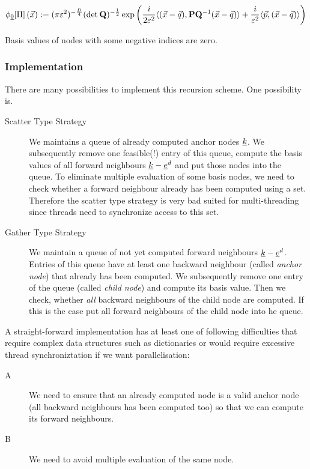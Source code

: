 \documentclass{article}
\begin{document}
\begin{equation}
  \label{eq:phi0_Dd}
  \phi_{\underline{0}}[\Pi]\left(\vec{x}\right)
  :=
  (\pi\varepsilon^2)^{-\frac{D}{4}} (\det\mathbf{Q})^{-\frac{1}{2}}
  \exp \left( \frac{i}{2\varepsilon^2}
    \langle (\vec{x}-\vec{q}) , \mathbf{P}\mathbf{Q}^\mathrm{-1}(\vec{x}-\vec{q}) \rangle
    + \frac{i}{\varepsilon^2} \langle \vec{p} , (\vec{x}-\vec{q}) \rangle
  \right)
\end{equation}

Basis values of nodes with some negative indices are zero.

\subsubsection{Implementation}
There are many possibilities to implement this recursion scheme. One
possibility is.
\begin{description}
\item[Scatter Type Strategy] We maintains a queue of already computed
  anchor nodes $\underline{k}$.  We subsequently remove one feasible(!)
  entry of this queue, compute the basis values of all forward
  neighbours $\underline{k}-\underline{e}^d$ and put those nodes into the
  queue.  To eliminate multiple evaluation of some basis nodes, we
  need to check whether a forward neighbour already has been computed
  using a set.  Therefore the scatter type strategy is very bad suited
  for multi-threading since threads need to synchronize access to this
  set.
\item[Gather Type Strategy] We maintain a queue of not yet computed
  forward neighbours $\underline{k}-\underline{e}^d$. Entries of this queue
  have at least one backward neighbour (called \emph{anchor node})
  that already has been computed.  We subsequently remove one entry of
  the queue (called \emph{child node}) and compute its basis value.
  Then we check, whether \emph{all} backward neighbours of the child
  node are computed. If this is the case put all forward neighbours of
  the child node into he queue.
\end{description}

A straight-forward implementation has at least one of following
difficulties that require complex data structures such as dictionaries
or would require excessive thread synchroniztation if we want
parallelisation:
\begin{description}
\item[A] We need to ensure that an already computed node is a valid
  anchor node (all backward neighbours has been computed too) so that
  we can compute its forward neighbours.
\item[B] We need to avoid multiple evaluation of the same node.
\end{description}
\end{document}
